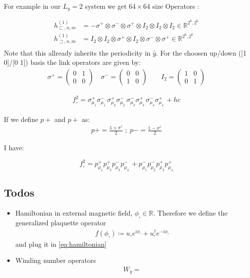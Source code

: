 \documentclass[12pt, a4paper, twoside, titlepage]{article}
\begin{document}
For example in our $L_y=2$ system we get $64 \times 64$ size Operators :

\begin{align}
h^{(1)}_{\sqsubset,n,m} &=-\sigma^+\otimes\sigma^-\otimes\sigma^+\otimes I_2 \otimes I_2 \otimes I_2 \in \mathbb{R}^{2^6,2^6}\\
h^{(1)}_{\sqsupset,n,m} &=I_2 \otimes I_2 \otimes \sigma^+ \otimes I_2\otimes\sigma^-\otimes\sigma^+ \in \mathbb{R}^{2^6,2^6}\\
\end{align}
Note that this allready inherits the periodicity in $\hat{y}$. For the choosen up/down ([1 0]/[0 1]) basis the link operators are given by:
\begin{align}
\sigma^+=
\begin{pmatrix}
0 & 1 \\
0 & 0
\end{pmatrix}
\quad
\sigma^-=
\begin{pmatrix}
0 & 0 \\
1 & 0
\end{pmatrix}
\qquad
I_2 =
\begin{pmatrix}
1 & 0 \\
0 & 1
\end{pmatrix}
\end{align}





\begin{align}
	f^2_\square= \sigma^+_{\mu_1} \sigma^-_{\mu_1} \, \sigma^+_{\mu_2} \sigma^-_{\mu_2} \, \sigma^-_{\mu_3} \sigma^+_{\mu_3} \, \sigma^-_{\mu_4} \sigma^+_{\mu_4}  \, + hc
\end{align}

If we define $p+$ and $p+$ as:
\begin{align}
	p+= \frac{ \mathbb{1} + \sigma^z }{2} \; ;	\; p-= \frac{ \mathbb{1} - \sigma^z }{2}
\end{align}

I have:

\begin{equation}\label{eq:plaquette}
	f^2_\square = p^+_{\mu_1}p^+_{\mu_2} p^-_{\mu_3} p^-_{\mu_4}\, +  p^-_{\mu_1} p^-_{\mu_2} p^+_{\mu_3} p^+_{\mu_4}
\end{equation}

\subsection{Todos}
\begin{itemize}
  \item Hamiltonian in external magnetic field, $\phi_\square\in \mathbb{R}$.
    Therefore we define the generalized plaquette operator
    \begin{align}
      f(\phi_\square) \coloneqq u_\square e^{i\phi_\square}+ u^\dagger_\square e^{-i\phi_\square}
    \end{align}
    and plug it in \eqref{eq:hamiltonian}
  \item Winding number operators
    \begin{align}
      W_y =
    \end{align}
\end{itemize}
\end{document}
